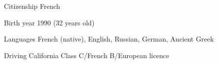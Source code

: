 
\begin{cvskills}

	\cvskill
	{Citizenship}
    {French}

	\cvskill
	{Birth year}
    {1990 (32 years old)}

	\cvskill
	{Languages}
    {French (native), English, Russian, German, Ancient Greek}

	\cvskill
	{Driving}
    {California Class C/French B/European licence}

\end{cvskills}
